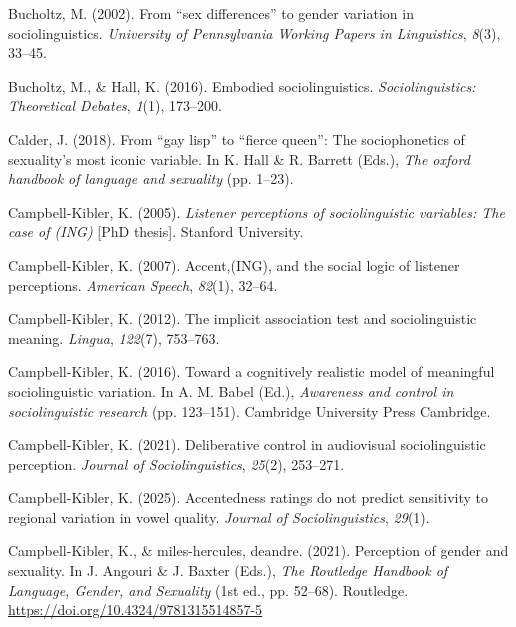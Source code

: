 \documentclass[
  letterpaper,
  DIV=11,
  numbers=noendperiod]{scrartcl}
\newlength{\cslhangindent}
\newenvironment{CSLReferences}[2] %
 {\begin{list}{}{%
  \setlength{\itemindent}{0pt}
  \setlength{\leftmargin}{0pt}
  \setlength{\parsep}{0pt}
  \ifodd #1
   \setlength{\leftmargin}{\cslhangindent}
   \setlength{\itemindent}{-1\cslhangindent}
  \fi
  \setlength{\itemsep}{#2\baselineskip}}}
 {\end{list}}
\begin{document}
\begin{CSLReferences}{1}{0}
Bucholtz, M. (2002). From {``sex differences''} to gender variation in
sociolinguistics. \emph{University of Pennsylvania Working Papers in
Linguistics}, \emph{8}(3), 33--45.

Bucholtz, M., \& Hall, K. (2016). Embodied sociolinguistics.
\emph{Sociolinguistics: Theoretical Debates}, \emph{1}(1), 173--200.

Calder, J. (2018). From {``gay lisp''} to {``fierce queen''}: The
sociophonetics of sexuality's most iconic variable. In K. Hall \& R.
Barrett (Eds.), \emph{The oxford handbook of language and sexuality}
(pp. 1--23).

Campbell-Kibler, K. (2005). \emph{Listener perceptions of
sociolinguistic variables: The case of (ING)} {[}PhD thesis{]}. Stanford
University.

Campbell-Kibler, K. (2007). Accent,(ING), and the social logic of
listener perceptions. \emph{American Speech}, \emph{82}(1), 32--64.

Campbell-Kibler, K. (2012). The implicit association test and
sociolinguistic meaning. \emph{Lingua}, \emph{122}(7), 753--763.

Campbell-Kibler, K. (2016). Toward a cognitively realistic model of
meaningful sociolinguistic variation. In A. M. Babel (Ed.),
\emph{Awareness and control in sociolinguistic research} (pp. 123--151).
Cambridge University Press Cambridge.

Campbell-Kibler, K. (2021). Deliberative control in audiovisual
sociolinguistic perception. \emph{Journal of Sociolinguistics},
\emph{25}(2), 253--271.

Campbell-Kibler, K. (2025). Accentedness ratings do not predict
sensitivity to regional variation in vowel quality. \emph{Journal of
Sociolinguistics}, \emph{29}(1).

Campbell-Kibler, K., \& miles-hercules, deandre. (2021). Perception of
gender and sexuality. In J. Angouri \& J. Baxter (Eds.), \emph{The
{Routledge} {Handbook} of {Language}, {Gender}, and {Sexuality}} (1st
ed., pp. 52--68). Routledge.
\url{https://doi.org/10.4324/9781315514857-5}


\end{CSLReferences}
\end{document}
